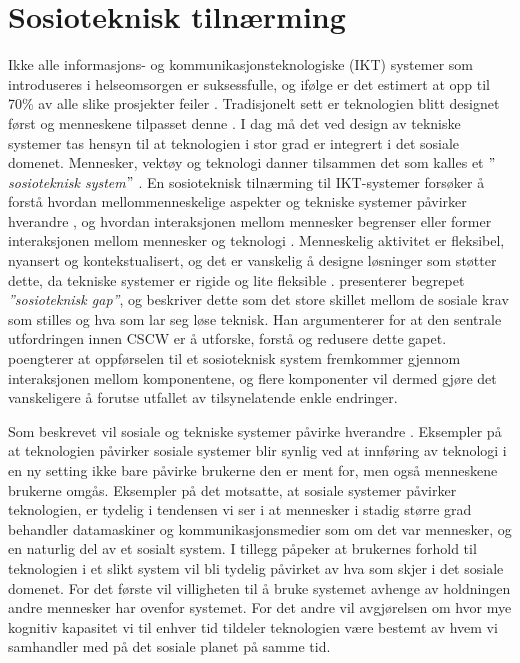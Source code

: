 \section{Sosioteknisk tilnærming}
\label{section:sosioteknisk}

Ikke alle informasjons- og kommunikasjonsteknologiske (IKT) systemer som introduseres i helseomsorgen er suksessfulle, og ifølge \citet{FITT} er det estimert at opp til 70\% av alle slike prosjekter feiler \citep{Coiera07}. Tradisjonelt sett er teknologien blitt designet først og menneskene tilpasset denne \citep{Appelbaum97}.
I dag må det ved design av tekniske systemer tas hensyn til at teknologien i stor grad er integrert i det sosiale domenet. Mennesker, vektøy og teknologi danner tilsammen det som kalles et \textit{$"$sosioteknisk system$"$} \citep{Coiera04}.
En sosioteknisk tilnærming til IKT-systemer forsøker å forstå hvordan mellommenneskelige aspekter og tekniske systemer påvirker hverandre \citep{Coiera04}, og hvordan interaksjonen mellom mennesker begrenser eller former interaksjonen mellom mennesker og teknologi \citep{Coiera07}. Menneskelig aktivitet er fleksibel, nyansert og kontekstualisert, og det er vanskelig å designe løsninger som støtter dette, da tekniske systemer er rigide og lite fleksible \citep{Ackermann00}. \citet{Ackerman00} presenterer begrepet \textit{”sosioteknisk gap”}, og beskriver dette som det store skillet mellom de sosiale krav som stilles og hva som lar seg løse teknisk. Han argumenterer for at den sentrale utfordringen innen CSCW er å utforske, forstå og redusere dette gapet. \citet{Coiera04} poengterer at oppførselen til et sosioteknisk system fremkommer gjennom interaksjonen mellom komponentene, og flere komponenter vil dermed gjøre det vanskeligere å forutse utfallet av tilsynelatende enkle endringer. 

\noindent
Som beskrevet vil sosiale og tekniske systemer påvirke hverandre \citep{Coiera04}. Eksempler på at teknologien påvirker sosiale systemer blir synlig ved at innføring av teknologi i en ny setting ikke bare påvirke brukerne den er ment for, men også menneskene brukerne omgås. Eksempler på det motsatte, at sosiale systemer påvirker teknologien, er tydelig i tendensen vi ser i at mennesker i stadig større grad behandler datamaskiner og kommunikasjonsmedier som om det var mennesker, og en naturlig del av et sosialt system. I tillegg påpeker \citet{Coiera07} at brukernes forhold til teknologien i et slikt system vil bli tydelig påvirket av hva som skjer i det sosiale domenet. For det første vil villigheten til å bruke systemet avhenge av holdningen andre mennesker har ovenfor systemet. For det andre vil avgjørelsen om hvor mye kognitiv kapasitet vi til enhver tid tildeler teknologien være bestemt av hvem vi samhandler med på det sosiale planet på samme tid.


